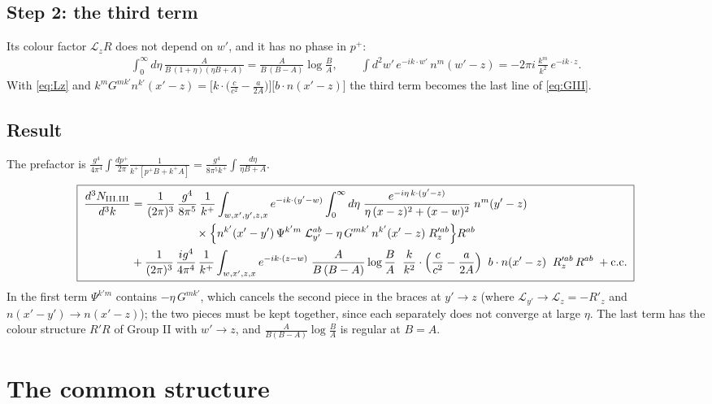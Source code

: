 \documentclass[10pt]{article}
\numberwithin{equation}{section}
\begin{document}
\subsection{Step 2: the third term}
Its colour factor $\mathcal{L}_{z}R$ does not depend on $w'$, and it has no phase in $p^{+}$:
\begin{align}
\int_{0}^{\infty}d\eta\,\frac{A}{B\,(1+\eta)(\eta B+A)}=\frac{A}{B\,(B-A)}\log\frac BA,\qquad
\int d^{2}w'\,e^{-ik\cdot w'}\,n^{m}(w'-z)=-2\pi i\,\frac{k^{m}}{k^{2}}\,e^{-ik\cdot z}.
\end{align}
With \eqref{eq:Lz} and $k^{m}G^{mk'}n^{k'}(x'-z)=\big[k\cdot\big(\tfrac{c}{c^{2}}-\tfrac{a}{2A}\big)\big]\big[b\cdot n(x'-z)\big]$ the third term becomes the last line of \eqref{eq:GIII}.

\subsection{Result}
The prefactor is $\frac{g^{4}}{4\pi^{4}}\int\frac{dp^{+}}{2\pi}\frac{1}{k^{+}[p^{+}B+k^{+}A]}=\frac{g^{4}}{8\pi^{5}k^{+}}\int\frac{d\eta}{\eta B+A}$.
\begin{align}
\boxed{\;\begin{aligned}
\frac{d^{3}N_{\rm III.III}}{d^{3}k}&=\frac{1}{(2\pi)^{3}}\,\frac{g^{4}}{8\pi^{5}}\,\frac{1}{k^{+}}\int_{w,x',y',z,x}e^{-ik\cdot(y'-w)}\int_{0}^{\infty}d\eta\;\frac{e^{-i\eta\,k\cdot(y'-z)}}{\eta\,(x-z)^{2}+(x-w)^{2}}\;n^{m}(y'-z)\\
&\hspace{2cm}\times\Big\{n^{k'}(x'-y')\,\Psi^{k'm}\;\mathcal{L}^{ab}_{y'}-\eta\,G^{mk'}\,n^{k'}(x'-z)\;R'^{ab}_{z}\Big\}R^{ab}\\
&+\frac{1}{(2\pi)^{3}}\,\frac{ig^{4}}{4\pi^{4}}\,\frac{1}{k^{+}}\int_{w,x',z,x}e^{-ik\cdot(z-w)}\;\frac{A}{B\,(B-A)}\log\frac{B}{A}\;\;\frac{k}{k^{2}}\cdot\Big(\frac{c}{c^{2}}-\frac{a}{2A}\Big)\;\;b\cdot n(x'-z)\;\;R'^{ab}_{z}\,R^{ab}\;+{\rm c.c.}
\end{aligned}\;} \label{eq:GIII}
\end{align}
In the first term $\Psi^{k'm}$ contains $-\eta\,G^{mk'}$, which cancels the second piece in the braces at $y'\to z$ (where $\mathcal{L}_{y'}\to\mathcal{L}_{z}=-R'_{z}$ and $n(x'-y')\to n(x'-z)$); the two pieces must be kept together, since each separately does not converge at large $\eta$. The last term has the colour structure $R'R$ of Group II with $w'\to z$, and $\frac{A}{B(B-A)}\log\frac BA$ is regular at $B=A$.

\section{The common structure}
\end{document}
